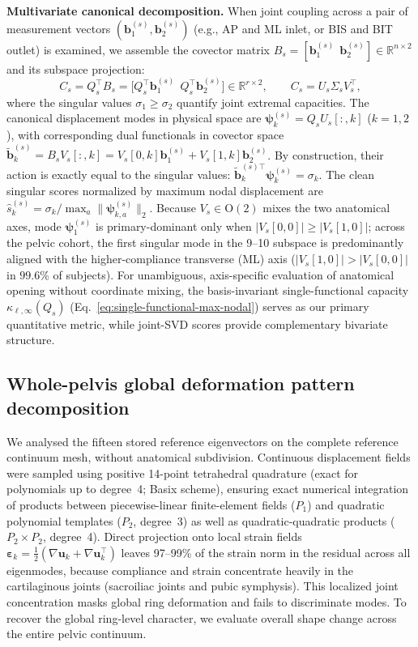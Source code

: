 \documentclass[11pt]{article}
\begin{document}
\noindent\textbf{Multivariate canonical decomposition.}
When joint coupling across a pair of measurement vectors $(\mathbf b_1^{(s)}, \mathbf b_2^{(s)})$ (e.g., AP and ML inlet, or BIS and BIT outlet) is examined, we assemble the covector matrix $B_s = [\mathbf b_1^{(s)}\ \ \mathbf b_2^{(s)}] \in \mathbb R^{n \times 2}$ and its subspace projection:
\begin{equation}
C_s = Q_s^\top B_s = \big[Q_s^\top\mathbf b_1^{(s)}\ \ Q_s^\top\mathbf b_2^{(s)}\big] \in \mathbb R^{r \times 2}, \qquad C_s = U_s \Sigma_s V_s^\top,
\label{eq:canonical-proj}
\end{equation}
where the singular values $\sigma_1 \ge \sigma_2$ quantify joint extremal capacities.
The canonical displacement modes in physical space are $\boldsymbol\psi_k^{(s)} = Q_s U_s[:, k]$ ($k=1, 2$), with corresponding dual functionals in covector space $\widetilde{\mathbf b}_k^{(s)} = B_s V_s[:, k] = V_s[0, k]\mathbf b_1^{(s)} + V_s[1, k]\mathbf b_2^{(s)}$.
By construction, their action is exactly equal to the singular values: $\widetilde{\mathbf b}_k^{(s)\top}\boldsymbol\psi_k^{(s)} = \sigma_k$.
The clean singular scores normalized by maximum nodal displacement are $\widehat s_k^{(s)} = \sigma_k / \max_a \|\boldsymbol\psi_{k,a}^{(s)}\|_2$.
Because $V_s \in \mathrm O(2)$ mixes the two anatomical axes, mode $\boldsymbol\psi_1^{(s)}$ is primary-dominant only when $|V_s[0, 0]| \ge |V_s[1, 0]|$; across the pelvic cohort, the first singular mode in the 9--10 subspace is predominantly aligned with the higher-compliance transverse (ML) axis ($|V_s[1, 0]| > |V_s[0, 0]|$ in $99.6\%$ of subjects).
For unambiguous, axis-specific evaluation of anatomical opening without coordinate mixing, the basis-invariant single-functional capacity $\kappa_{\ell,\infty}(Q_s)$ (Eq.~\ref{eq:single-functional-max-nodal}) serves as our primary quantitative metric, while joint-SVD scores provide complementary bivariate structure.

\subsection{Whole-pelvis global deformation pattern decomposition}
\label{sec:mechanisms-methods}

We analysed the fifteen stored reference eigenvectors on the complete reference continuum mesh, without anatomical subdivision.
Continuous displacement fields were sampled using positive 14-point tetrahedral quadrature (exact for polynomials up to degree~4; Basix scheme), ensuring exact numerical integration of products between piecewise-linear finite-element fields ($P_1$) and quadratic polynomial templates ($P_2$, degree~3) as well as quadratic-quadratic products ($P_2 \times P_2$, degree~4).
Direct projection onto local strain fields $\boldsymbol\varepsilon_k=\tfrac12(\nabla\mathbf u_k+\nabla\mathbf u_k^\top)$ leaves 97--99\% of the strain norm in the residual across all eigenmodes, because compliance and strain concentrate heavily in the cartilaginous joints (sacroiliac joints and pubic symphysis).
This localized joint concentration masks global ring deformation and fails to discriminate modes.
To recover the global ring-level character, we evaluate overall shape change across the entire pelvic continuum.
\end{document}
